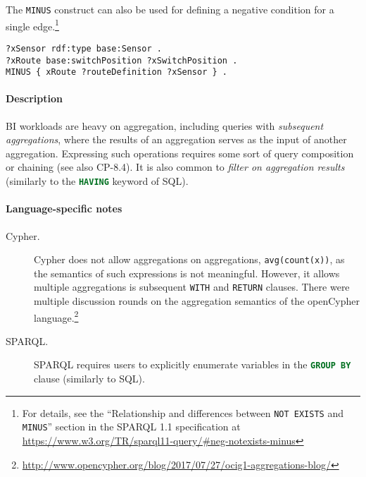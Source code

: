 \begin{description}
The \lstinline{MINUS} construct can also be used for defining a negative condition for a single edge.\footnote{For details, see the ``Relationship and differences between \lstinline[language=sparql]{NOT EXISTS} and \lstinline[language=sparql]{MINUS}'' section in the SPARQL 1.1 specification at \url{https://www.w3.org/TR/sparql11-query/\#neg-notexists-minus}}

\begin{minipage}{\linewidth}
\begin{lstlisting}[language=sparql]
?xSensor rdf:type base:Sensor .
?xRoute base:switchPosition ?xSwitchPosition .
MINUS { xRoute ?routeDefinition ?xSensor } .
\end{lstlisting}
\end{minipage}

\end{description}






\paragraph{Description}

BI workloads are heavy on aggregation, including queries with \emph{subsequent
aggregations}, where the results of an aggregation serves as the input of
another aggregation. Expressing such operations requires some sort of query
composition or chaining (see also CP-8.4). It is also common to \emph{filter on
aggregation results} (similarly to the \lstinline[language=sql]{HAVING} keyword of SQL).

\paragraph{Language-specific notes}

\begin{description}
\item[Cypher.] Cypher does not allow aggregations on aggregations, \eg \lstinline[language=cypher]{avg(count(x))}, as the semantics of such expressions is not meaningful. However, it allows multiple aggregations is subsequent \lstinline[language=cypher]{WITH} and  \lstinline[language=cypher]{RETURN} clauses. There were multiple discussion rounds on the aggregation semantics of the openCypher language.\footnote{\url{http://www.opencypher.org/blog/2017/07/27/ocig1-aggregations-blog/}}

\item[SPARQL.] SPARQL requires users to explicitly enumerate variables in the \lstinline[language=sql]{GROUP BY} clause (similarly to SQL).
\end{description}

